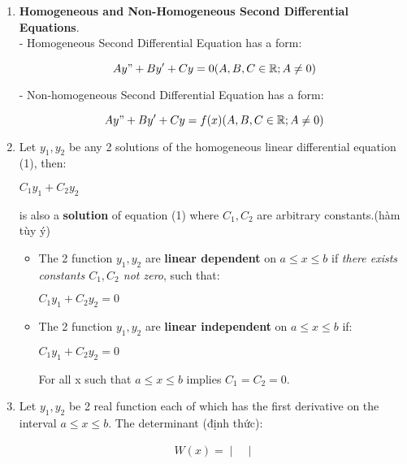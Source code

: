 \documentclass[10pt]{article}
\begin{document}
\begin{enumerate}
	\item \textbf{Homogeneous and Non-Homogeneous Second Differential Equations}.\\
	- Homogeneous Second Differential Equation has a form:
	\begin{mybox}
	\begin{center}
	\begin{equation}
	Ay" + By' + Cy = 0 (A,B,C \in \mathbb{R}; A \not = 0)
	\end{equation}
	\end{center}
	\end{mybox}
	- Non-homogeneous Second Differential Equation has a form:
	\begin{mybox}
	\begin{center}
	\begin{equation}
	Ay" + By' + Cy = f(x) (A,B,C \in \mathbb{R}; A \not = 0)
	\end{equation}
	\end{center}
	\end{mybox}
	\item Let $\textbf{$y_1,y_2$}$ be any 2 solutions of the homogeneous linear differential equation (1), then:
	\begin{center}
	$\textbf{$C_1y_1 + C_2y_2$}$
	\end{center}
	is also a \textbf{solution} of equation (1) where $C_1, C_2$ are arbitrary constants.(hàm tùy ý)
	\begin{itemize}
	\item The 2 function $y_1,y_2$ are \textbf{linear dependent} on $a \le x \le b$ if \textit{there exists constants $C_1,C_2$ not zero}, such that:
	\begin{center}
	$C_1y_1 + C_2y_2 = 0$
	\end{center}
	\item The 2 function $y_1,y_2$ are \textbf{linear independent} on $a \le x \le b$ if:
	\begin{center}
	$C_1y_1 + C_2y_2 = 0$
	\end{center}
	For all x such that $a \le x \le b$ implies $C_1 = C_2 = 0$.
	\end{itemize}
	\item Let $y_1,y_2$ be 2 real function each of which has the first derivative on the interval $a \le x \le b$. The determinant (định thức):
	\begin{center}
	\begin{align*}
	W(x) = 
	\begin{vmatrix}

\end{vmatrix}
\end{align*}
\end{center}
\end{enumerate}
\end{document}
